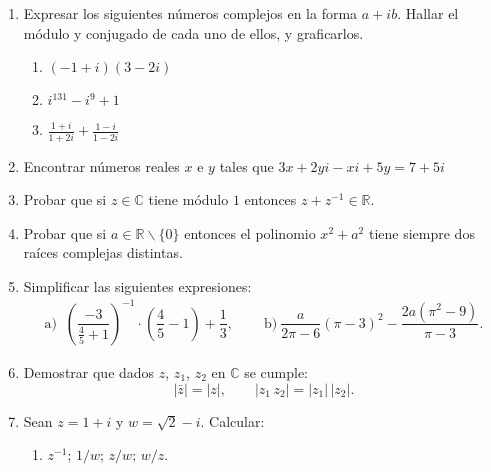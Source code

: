 \documentclass[a4paper,12pt,twoside,spanish,reqno]{amsbook}
\numberwithin{equation}{section}
\newcommand \C{{\mathbb C}}
\begin{document}
\begin{enumerate}

\item Expresar los siguientes n{ú}meros complejos en la forma $a +i b$.
Hallar el módulo y conjugado de cada uno de ellos, y graficarlos.

\begin{multicols}{3}
\begin{enumerate}
\item $(-1+i) (3-2i)$
\item $i^{131} - i^9 +1$
\item $\frac {1+i}{1+2i} + \frac{1-i}{1-2i}$
\end{enumerate}
\end{multicols}

\vspace{.5cm}


\item Encontrar números reales $x$ e $y$ tales que $3x+2yi-xi+5y = 7 + 5i$


\vspace{.5cm}

\item Probar que si $z \in \mathbb{C}$ tiene módulo $1$ entonces $z + z^{-1} \in \mathbb{R}.$

\vspace{.5cm}

\item Probar que si $a\in \mathbb{R}\backslash \{0\}$ entonces el polinomio $x^2+a^2$ tiene siempre dos raíces complejas distintas.

\vspace{.5cm}

\item
Simplificar las siguientes expresiones:
$$\begin{array}{ll}
 \text{a) } \ \left(\dfrac{-3}{\frac{4}{5}+1}\right)^{-1}\cdot\left(\dfrac{4}{5}-1\right) + \dfrac{1}{3}, \quad &
\text{ b)} \ \dfrac{a}{2\pi-6}(\pi-3)^2 -\dfrac{2a(\pi^2-9)}{\pi-3}.
\end{array}$$

\vspace{.5cm}


\item Demostrar que  dados $z$, $z_1$, $z_2$ en $\C$ se cumple:
\[ |\bar z|= |z|, \qquad |z_1 \, z_2|= |z_1| \, |z_2|. \]

\vspace{.5cm}


\item Sean $z=1+i$ y $w=\sqrt{2}-i$. Calcular:
 \begin{enumerate}
  \item $z^{-1}$; $1/w$; $z/w$; $w/z$.


\end{enumerate}
\end{enumerate}
\end{document}
